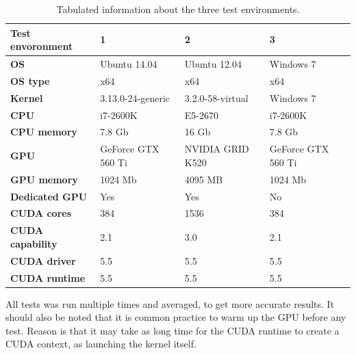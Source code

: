\begin{table}[ht]
\centering
    \begin{tabular}{|l|l|l|l|}
        \hline
        \textbf{Test envoronment} & \textbf{1}         & \textbf{2}       & \textbf{3}\\ \hline
        \textbf{OS}               & Ubuntu 14.04       & Ubuntu 12.04     & Windows 7  \\ \hline
        \textbf{OS type}          & x64                & x64              & x64     \\ \hline
        \textbf{Kernel}           & 3.13.0-24-generic  & 3.2.0-58-virtual & Windows 7      \\ \hline
        \textbf{CPU}              & i7-2600K           & E5-2670          & i7-2600K       \\ \hline
        \textbf{CPU memory}       & 7.8 Gb             & 16 Gb            & 7.8 Gb \\ \hline
        \textbf{GPU}              & GeForce GTX 560 Ti & NVIDIA GRID K520 & GeForce GTX 560 Ti      \\ \hline
        \textbf{GPU memory}       & 1024 Mb            & 4095 MB          & 1024 Mb      \\ \hline
        \textbf{Dedicated GPU}    & Yes                & Yes              & No       \\ \hline
        \textbf{CUDA cores}       & 384                & 1536             & 384       \\ \hline
        \textbf{CUDA capability}  & 2.1                & 3.0              & 2.1       \\ \hline
        \textbf{CUDA driver}      & 5.5                & 5.5              & 5.5       \\ \hline
        \textbf{CUDA runtime}     & 5.5                & 5.5              & 5.5       \\ \hline
    \end{tabular}
    \caption{Tabulated information about the three test environments.}
    \label{tbl:test_envoronments}
\end{table}



All tests was run multiple times and averaged, to get more accurate results. It should also be noted that it is common practice to warm up the GPU before any test. Reason is that it may take as long time for the CUDA runtime to create a CUDA context, as launching the kernel itself.


